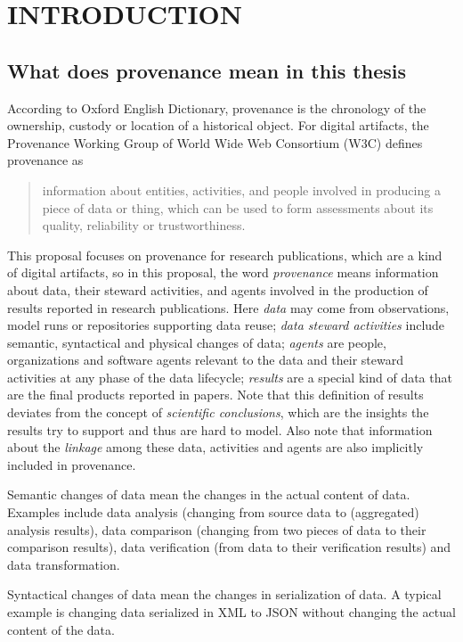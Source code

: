 \chapter{INTRODUCTION}
\section{What does provenance mean in this thesis}
According to Oxford English Dictionary, provenance is the chronology of the ownership, custody or 
location of a historical object. For digital artifacts, the Provenance Working Group of World Wide 
Web Consortium (W3C) defines provenance as \begin{quote}information about entities, activities, and 
people involved in producing a piece of data or thing, which can be used to form assessments about 
its quality, reliability or trustworthiness.\end{quote} This proposal focuses on provenance for 
research publications, which are a kind of digital artifacts, so in this proposal, the word 
\emph{provenance} means information about data, their steward activities, and agents involved in the 
production of results reported in research publications. Here \emph{data} may come from observations, 
model runs or repositories supporting data reuse; \emph{data steward activities} include semantic, 
syntactical and physical changes of data; \emph{agents} are people, organizations and software agents 
relevant to the data and their steward activities at any phase of the data lifecycle; \emph{results} 
are a special kind of data that are the final products reported in papers. Note that this definition 
of results deviates from the concept of \emph{scientific conclusions}, which are the insights the results try to support and thus are hard to model. Also note that information about the \emph{linkage} among these data, activities and agents are also implicitly included in provenance.

Semantic changes of data mean the changes in the actual content of data. Examples include data 
analysis (changing from source data to (aggregated) analysis results), data comparison (changing from 
two pieces of data to their comparison results), data verification (from data to their verification 
results) and data transformation. 

Syntactical changes of data mean the changes in serialization of data. A typical example is changing 
data serialized in XML to JSON without changing the actual content of the data.


